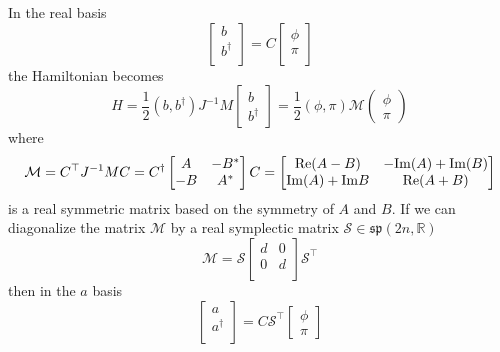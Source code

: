 In the real basis
\begin{equation}
\begin{bmatrix}
b \\
b^{\dagger} \\
\end{bmatrix}
=
C
\begin{bmatrix}
\phi \\
\pi \\
\end{bmatrix}
\end{equation}
the Hamiltonian becomes
\begin{equation}
H = \frac{1}{2} ( b, b^{\dagger}) J^{-1} M 
\begin{bmatrix}
b \\
b^{\dagger} 
\end{bmatrix}
= \frac{1}{2} ( \phi, \pi )
\mathcal{M} 
\begin{pmatrix}
\phi \\
\pi 
\end{pmatrix}
\end{equation}
where
\begin{equation}
\mathcal{M} = C^{\top} J^{-1} M C = C^{\dagger} 
\begin{bmatrix}
A & - B^* \\
-B & A^* \\                                             
\end{bmatrix}C =
\begin{bmatrix}
{\rm Re}(A - B ) & -{\rm Im}( A ) + {\rm Im}( B  )\\
{\rm Im}(A) + {\rm Im} B & {\rm Re}(A+ B ) 
\end{bmatrix} 
\end{equation}
is a real symmetric matrix based on the symmetry of $A$ and $B$. If we can diagonalize the matrix $\mathcal{M}$ by a real symplectic matrix $\mathcal{S} \in \mathfrak{sp}( 2n, \mathbb{R} ) $
\begin{equation}
\mathcal{M} = \mathcal{S}
\begin{bmatrix}
d & 0 \\
0 & d \\
\end{bmatrix} \mathcal{S}^{\top}
\end{equation}
then in the $a$ basis
\begin{equation}
\begin{bmatrix}
a \\
a^{\dagger}\\
\end{bmatrix}
= C \mathcal{S}^{\top}
\begin{bmatrix}
\phi \\
\pi 
\end{bmatrix}
\end{equation}
